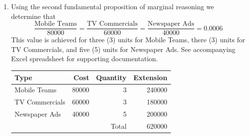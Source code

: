 \documentclass[letterpaper,10pt]{article}
\begin{document}
\begin{enumerate}
\item Using the second fundamental proposition of marginal reasoning we determine that \[\frac{\mbox{Mobile Teams}}{80000}=\frac{\mbox{TV Commercials}}{60000}=\frac{\mbox{Newspaper Ads}}{40000}=0.0006\]This value is achieved for three (3) units for Mobile Teams, there (3) units for TV Commercials, and five (5) units for Newspaper Ads.  See accompanying Excel spreadsheet for supporting documentation.
\begin{table}[htdp]
\begin{center}
\begin{tabular}{lrrr}
\hline
Type & Cost & Quantity & Extension \\
\hline
Mobile Teams & 80000 & 3 & 240000 \\
TV Commercials & 60000 & 3 & 180000 \\
Newspaper Ads & 40000 & 5 & 200000 \\
\hline
& & Total & 620000
\end{tabular}
\end{center}
\label{default}
\end{table}


\end{enumerate}
\end{document}
